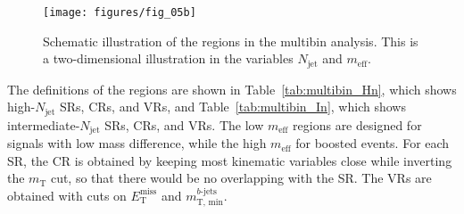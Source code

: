 \begin{figure}[H]
	\texttt{[image: figures/fig\_05b]}
	\centering

	\caption{Schematic illustration of the regions in the multibin analysis. This
		is a two-dimensional illustration in the variables $N_{\text{jet}}$ and
		$m_{\text{eff}}$.}

	\label{f:fig_05b}
\end{figure}

The definitions of the regions are shown in Table~\ref{tab:multibin_Hn}, which
shows high-$N_{\text{jet}}$ SRs, CRs, and VRs, and Table~\ref{tab:multibin_In},
which shows intermediate-$N_{\text{jet}}$ SRs, CRs, and VRs. The low
$m_{\text{eff}}$ regions are designed for signals with low mass difference,
while the high $m_{\text{eff}}$ for boosted events. For each SR, the CR is
obtained by keeping most kinematic variables close while inverting the
$m_{\text{T}}$ cut, so that there would be no overlapping with the SR. The VRs
are obtained with cuts on $E_{\text{T}}^{\text{miss}}$ and $m_{\text{T,
				min}}^{b\text{-jets}}$.


